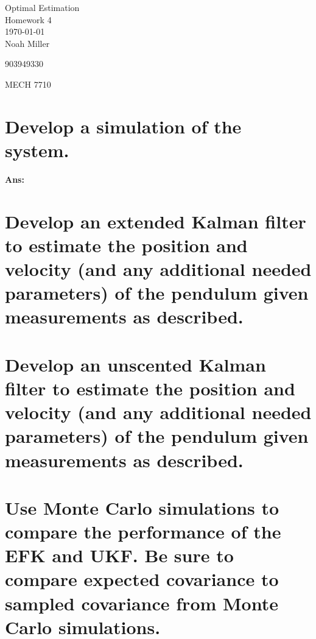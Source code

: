 \documentclass[12pt,letterpaper, onecolumn]{exam}
\begin{document}
\begingroup
\centering
\LARGE Optimal Estimation\\
\LARGE Homework 4 \\[0.5em]
\large \today\\[0.5em]
\large Noah Miller\par
\large 903949330\par
\large MECH 7710\par
\endgroup
\pointsdroppedatright   %
\printanswers
\renewcommand{\solution}{\noindent\textbf{Ans:}\enspace}   %
\vspace{.5cm}

\begin{questions}
    \begin{parts}
        \part{Develop a simulation of the system.}

        \solution{%
             
        }
        \part{Develop an extended Kalman filter to estimate the position and velocity (and any additional needed parameters) of the pendulum given measurements as described.}

        \part{Develop an unscented Kalman filter to estimate the position and velocity (and any additional needed parameters) of the pendulum given measurements as described.}

        \part{Use Monte Carlo simulations to compare the performance of the EFK and UKF. Be sure to compare expected covariance to sampled covariance from Monte Carlo simulations.}
    \end{parts}


\end{questions}
\end{document}
